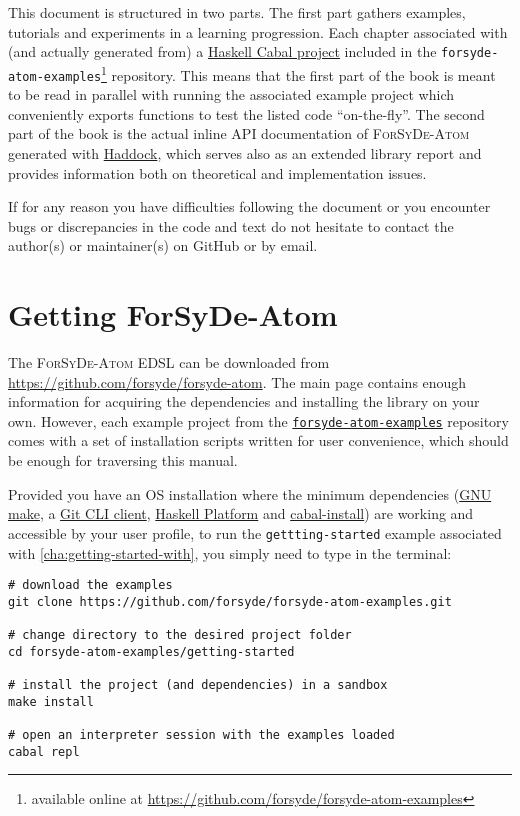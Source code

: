 \documentclass{book}
\begin{document}
\begin{refsection}
This document is structured in two parts. The first part gathers examples, tutorials and experiments in a learning progression. Each chapter associated with (and actually generated from) a \href{https://www.haskell.org/cabal/}{Haskell Cabal project} included in the \texttt{forsyde-atom-examples}\footnote{available online at \url{https://github.com/forsyde/forsyde-atom-examples}} repository. This means that the first part of the book is meant to be read in parallel with running the associated example project which conveniently exports functions to test the listed code ``on-the-fly''. The second part of the book is the actual inline API documentation of \textsc{ForSyDe-Atom} generated with \href{https://www.haskell.org/haddock/}{Haddock}, which serves also as an extended library report and provides information both on theoretical and implementation issues.

\begin{summary}
  If for any reason you have difficulties following the document or you encounter bugs or discrepancies in the code and text do not hesitate to contact the author(s) or maintainer(s) on GitHub or by email. 
\end{summary}

\section{Getting {{\sc ForSyDe-Atom}}}
\label{sec:getting-forsyde-atom}

The \textsc{ForSyDe-Atom} EDSL can be downloaded from \url{https://github.com/forsyde/forsyde-atom}. The main page contains enough information for acquiring the dependencies and installing the library on your own. However, each example project from the \href{https://github.com/forsyde/forsyde-atom-examples}{\texttt{forsyde-atom-examples}} repository comes with a set of installation scripts written for user convenience, which should be enough for traversing this manual.

Provided you have an OS installation where the minimum dependencies (\href{https://www.gnu.org/software/make/}{GNU make}, a \href{https://git-scm.com/downloads}{Git CLI client}, \href{https://www.haskell.org/platform/}{Haskell Platform} and \href{https://www.haskell.org/cabal/download.html}{cabal-install}) are working and accessible by your user profile, to run the \texttt{gettting-started} example associated with \cref{cha:getting-started-with}, you simply need to type in the terminal:

\begin{verbatim}
# download the examples
git clone https://github.com/forsyde/forsyde-atom-examples.git

# change directory to the desired project folder
cd forsyde-atom-examples/getting-started

# install the project (and dependencies) in a sandbox
make install

# open an interpreter session with the examples loaded
cabal repl
\end{verbatim}



\printbibliography[heading=subbibliography]
\end{refsection}
\end{document}
